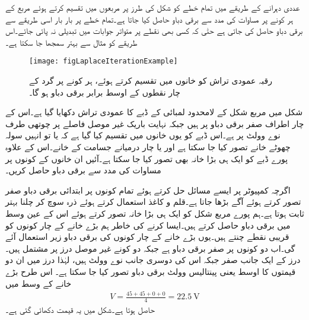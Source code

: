 عددی دہرانے کے طریقے میں تمام خطے کو شکل  کی طرز پر مربعوں میں تقسیم کرتے ہوئے مربع کے ہر کونے پر  مساوات  کی مدد سے برقی دباو حاصل کیا جاتا ہے۔تمام خطے پر بار بار اسی طریقے سے برقی دباو حاصل کی جاتی ہے حتٰی کہ کسی بھی نقطے پر متواتر جوابات میں  تبدیلی نہ پائی جائے۔اس طریقے کو مثال سے بہتر سمجھا جا سکتا ہے۔

\begin{figure}
\centering
\texttt{[image: figLaplaceIterationExample]}
\caption{رقبہ عمودی تراش کو خانوں میں تقسیم کرتے ہوئے، ہر کونے پر گرد کے چار نقطوں کے اوسط برابر برقی دباو ہو گا۔}
\label{شکل_لاپلاس_دہرانے_کا_طریقہ}
\end{figure}

شکل  میں مربع شکل کے لامحدود لمبائی کے ڈبے کا عمودی تراش دکھایا گیا ہے۔اس کے چار اطراف صفر برقی دباو پر ہیں جبکہ نہایت باریک غیر موصل فاصلے پر چوتھی طرف نوے وولٹ پر ہے۔اس ڈبے کو یوں خانوں میں تقسیم کیا گیا ہے کہ یا تو انہیں سولہ چھوٹے خانے تصور کیا جا سکتا ہے اور یا چار درمیانے جسامت کے خانے۔اس کے علاوہ پورے ڈبے کو ایک ہی بڑا خانہ بھی تصور کیا جا سکتا ہے۔آئیں ان خانوں کے کونوں پر مساوات  کی مدد سے برقی دباو حاصل کریں۔

اگرچہ کمپیوٹر پر ایسے مسائل حل کرتے ہوئے تمام کونوں پر ابتدائی برقی دباو صفر تصور کرتے ہوئے آگے بڑھا جاتا ہے۔قلم و کاغذ استعمال کرتے ہوئے ذرہ سوچ کر چلنا بہتر ثابت ہوتا ہے۔ہم پورے مربع شکل کو ایک ہی بڑا خانہ تصور کرتے ہوئے اس کے عین وسط میں برقی دباو حاصل کرتے ہیں۔ایسا کرنے کی خاطر ہم بڑے خانے کے چار کونوں کو قریبی نقطے چنتے ہیں۔یوں بڑے خانے کے چار کونوں کی برقی دباو زیر استعمال آئے گی۔اب دو کونوں پر صفر برقی دباو ہے جبکہ دو کونے غیر موصل درز پر مشتمل ہیں۔درز کے ایک جانب صفر جبکہ اس کی دوسری جانب نوے وولٹ ہیں، لہٰذا درز میں ان دو قیمتوں کا اوسط یعنی پینتالیس وولٹ برقی دباو تصور کیا جا سکتا ہے۔ اس طرح بڑے خانے کے وسط میں
\begin{align*}
V=\frac{45+45+0+0}{4}=\SI{22.5}{\volt}
\end{align*}
حاصل ہوتا ہے۔شکل  میں یہ قیمت دکھائی گئی ہے۔


